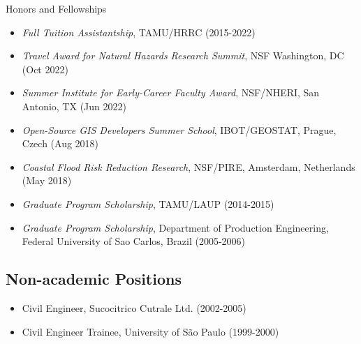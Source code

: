 \documentclass[11pt,oneside]{article}
\begin{document}
\vspace{3pt}

{Honors and Fellowships}
\begin{itemize}[leftmargin=20pt]
\item \emph{Full Tuition Assistantship}, TAMU/HRRC (2015-2022)
\item \emph{Travel Award for Natural Hazards Research Summit}, NSF Washington, DC (Oct 2022)
\item \emph{Summer Institute for Early-Career Faculty Award}, NSF/NHERI, San Antonio, TX (Jun 2022)
\item \emph{Open-Source GIS Developers Summer School}, IBOT/GEOSTAT, Prague, Czech (Aug 2018)
\item \emph{Coastal Flood Risk Reduction Research}, NSF/PIRE, Amsterdam, Netherlands (May 2018)
\item \emph{Graduate Program Scholarship}, TAMU/LAUP (2014-2015)
\item \emph{Graduate Program Scholarship}, Department of Production Engineering, Federal University of Sao Carlos, Brazil (2005-2006)
\end{itemize}

\subsection*{Non-academic Positions}
\begin{itemize}[leftmargin=20pt]
\item Civil Engineer, Sucocitrico Cutrale Ltd. (2002-2005)
\item Civil Engineer Trainee, University of São Paulo (1999-2000)
\end{itemize}
\end{document}
